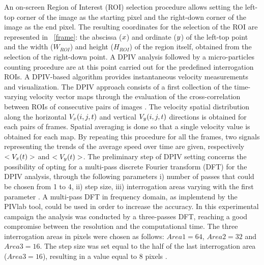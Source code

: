 \documentclass[journal]{IEEEtran}
\theoremstyle{definition}
\theoremstyle{remark}
\begin{document}
An on-screen Region of Interest (ROI) selection procedure allows setting the left-top corner of the image as the starting pixel and the right-down corner of the image as the end pixel. The resulting coordinates for the selection of the ROI are represented in ~\fig\ref{frame}: the abscissa ($x$) and ordinate ($y$) of the left-top point and the width ($W_{ROI}$) and height ($H_{ROI}$) of the region itself, obtained from the selection of the right-down point. 
A DPIV analysis followed by a micro-particles counting procedure are at this point carried out for the predefined interrogation ROIs. A DPIV-based algorithm provides instantaneous velocity measurements and visualization. The DPIV approach consists of a first collection of the time-varying velocity vector maps through the evaluation of the cross-correlation between ROIs of consecutive pairs of images . 
The velocity spatial distribution along the horizontal $V_{x}({i},{j},t)$ and vertical $V_{y}({i},{j},t)$ directions is obtained for each pairs of frames. Spatial averaging is done so that a single velocity value is obtained for each map. By repeating this procedure for all the frames, two signals representing the trends of the average speed over time are given, respectively $<V_{x}(t)>$ and $<V_{y}(t)>$.
The preliminary step of DPIV setting concerns the possibility of opting for a multi-pass discrete Fourier transform (DFT) for the DPIV analysis, through the following parameters i) number of passes that could be chosen from 1 to 4, ii) step size, iii) interrogation areas varying with the first parameter . 
A multi-pass DFT in frequency domain, as implemtend by the PIVlab tool, could be used in order to increase the accuracy. In this experimental campaign the analysis was conducted by a three-passes DFT, reaching a good compromise between the resolution and the computational time. The three interrogation areas in pixels were chosen as follows: $Area1=64$, $Area2=32$ and $Area3=16$. The step size was set equal to the half of the last interrogation area ($Area3=16$), resulting in a value equal to 8 pixels .
\end{document}
